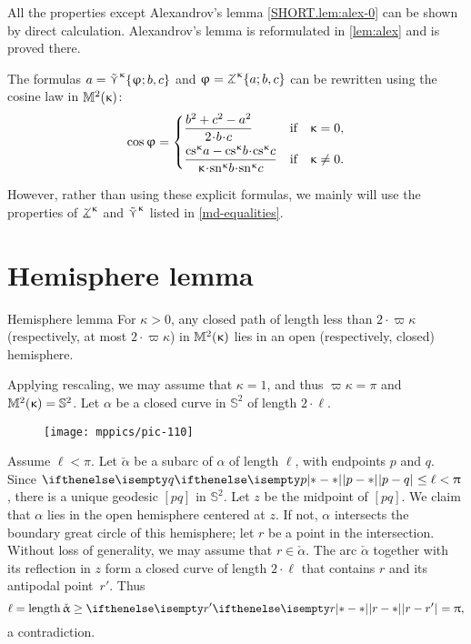 All the properties except Alexandrov's lemma \ref{SHORT.lem:alex-0} can be shown by direct calculation. Alexandrov's lemma is reformulated in \ref{lem:alex} and is proved there.

The formulas $a
=
\mathop{\tilde\curlyvee}\nolimits^{\upkappa}\{\upvarphi;b,c\}$ and
$\phi
=
\tangle\mc\kappa\{a;b,c\}$
can be rewritten using the cosine law in $\mathbb{M}_{{}}^{2}({\upkappa})$:
\[\cos\phi
=\left\{\begin{aligned}
&\frac{b^2+c^2-a^2}{2\cdot b\cdot c}
&\text{if}&\quad \kappa=0,
\\
&\frac{\cs\kappa a-\cs\kappa b\cdot\cs\kappa c}{\kappa\cdot\sn\kappa b\cdot\sn\kappa c}
&\text{if}&\quad \kappa\ne0.
\end{aligned}\right.\]

However, rather than using these explicit formulas, we mainly will use
the properties of $\tangle\mc\kappa$ and $\mathop{\tilde\curlyvee}\nolimits^{\upkappa}$ listed in \ref{md-equalities}.

\section{Hemisphere lemma}\label{curves-in-model}

\begin{thm}{Hemisphere lemma}
\label{lem:hemisphere}
For $\kappa>0$, any closed path of length less than $2\cdot \varpi\kappa$ (respectively, at most $2\cdot \varpi\kappa$) in $\mathbb{M}_{{}}^{2}({\upkappa})$ lies in an open (respectively, closed) hemisphere. 
\end{thm}

Applying rescaling, we may assume that $\kappa=1$, and thus $\varpi\kappa=\pi$ and $\mathbb{M}_{{}}^{2}({\upkappa})=\mathbb{S}^2$.
Let $\alpha$ be a closed curve in $\mathbb{S}^2$ of length $2\cdot\ell$.

\begin{wrapfigure}{o}{35 mm}
\vskip-0mm
\centering
\texttt{[image: mppics/pic-110]}
\end{wrapfigure}

Assume $\ell<\pi$.
Let $\check\alpha$ be a subarc of $\alpha$ of length $\ell$, with endpoints $p$ and $q$. 
Since $\dist{p}{q}{}\le\ell<\pi$, there is a unique geodesic $[pq]$ in $\mathbb{S}^2$. 
Let $z$ be the midpoint of $[pq]$. 
We claim that $\alpha$ lies in the open hemisphere centered at $z$. 
If not, $\alpha$ intersects the boundary great circle of this hemisphere; let $r$ be a point in the intersection.
Without loss of generality, we may assume that $r\in\check\alpha$. 
The arc $\check\alpha$ together with its reflection in $z$ form a closed curve of length $2\cdot \ell$ that contains $r$ and its antipodal point~$r'$.
Thus 
\[\ell=\length \check\alpha\ge \dist{r}{r'}{}=\pi,\] 
a contradiction.

